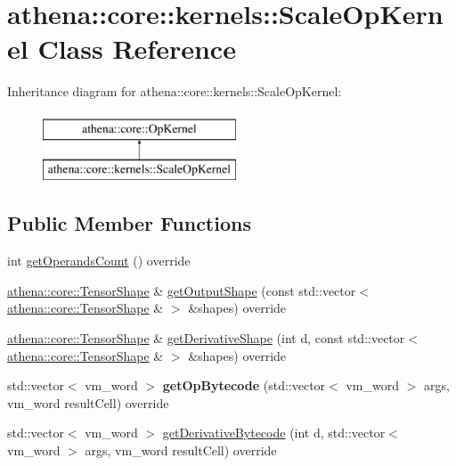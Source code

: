 \hypertarget{classathena_1_1core_1_1kernels_1_1_scale_op_kernel}{}\section{athena\+:\+:core\+:\+:kernels\+:\+:Scale\+Op\+Kernel Class Reference}
\label{classathena_1_1core_1_1kernels_1_1_scale_op_kernel}
Inheritance diagram for athena\+:\+:core\+:\+:kernels\+:\+:Scale\+Op\+Kernel\+:\begin{figure}[H]
\begin{center}
\leavevmode
\includegraphics[height=2.000000cm]{classathena_1_1core_1_1kernels_1_1_scale_op_kernel}
\end{center}
\end{figure}
\subsection*{Public Member Functions}
\begin{DoxyCompactItemize}
\item 
int \mbox{\hyperlink{classathena_1_1core_1_1kernels_1_1_scale_op_kernel_a4f9e4fee100ed7f09840fa4b2d55f2bf}{get\+Operands\+Count}} () override
\item 
\mbox{\hyperlink{classathena_1_1core_1_1_tensor_shape}{athena\+::core\+::\+Tensor\+Shape}} \& \mbox{\hyperlink{classathena_1_1core_1_1kernels_1_1_scale_op_kernel_afdd5df13d53df932af26968714a2beed}{get\+Output\+Shape}} (const std\+::vector$<$ \mbox{\hyperlink{classathena_1_1core_1_1_tensor_shape}{athena\+::core\+::\+Tensor\+Shape}} \& $>$ \&shapes) override
\item 
\mbox{\hyperlink{classathena_1_1core_1_1_tensor_shape}{athena\+::core\+::\+Tensor\+Shape}} \& \mbox{\hyperlink{classathena_1_1core_1_1kernels_1_1_scale_op_kernel_a7f9519bf17e1d70b56aa70cc49981470}{get\+Derivative\+Shape}} (int d, const std\+::vector$<$ \mbox{\hyperlink{classathena_1_1core_1_1_tensor_shape}{athena\+::core\+::\+Tensor\+Shape}} \& $>$ \&shapes) override
\item 
\mbox{\label{classathena_1_1core_1_1kernels_1_1_scale_op_kernel_a1b088e9abe5556913123a7c9c8880ec0}} 
std\+::vector$<$ vm\+\_\+word $>$ {\bfseries get\+Op\+Bytecode} (std\+::vector$<$ vm\+\_\+word $>$ args, vm\+\_\+word result\+Cell) override
\item 
std\+::vector$<$ vm\+\_\+word $>$ \mbox{\hyperlink{classathena_1_1core_1_1kernels_1_1_scale_op_kernel_ad35869239968db73049161acbad05aab}{get\+Derivative\+Bytecode}} (int d, std\+::vector$<$ vm\+\_\+word $>$ args, vm\+\_\+word result\+Cell) override
\end{DoxyCompactItemize}

